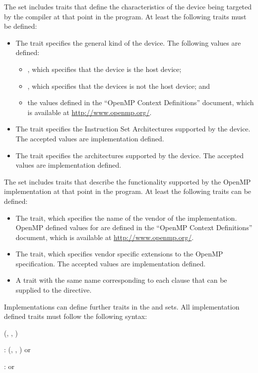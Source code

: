 The  set includes traits that define the characteristics of the device being targeted by the compiler at that point in the program. At least the following traits must be defined:
\begin{itemize}
 \item The  trait specifies the general kind of the device. The following  values are defined:
 \begin{itemize}
  \item {}, which specifies that the device is the host device;
  \item {}, which specifies that the devices is not the host device; and
  \item the values defined in the ``OpenMP Context Definitions'' document,
      which is available at \url{http://www.openmp.org/}.
 \end{itemize}

 \item The  trait specifies the Instruction Set Architectures supported by the device. The accepted  values are implementation defined.
 \item The  trait specifies the architectures supported by the device. The accepted  values are implementation defined.
\end{itemize}

The  set includes traits that describe the functionality supported by the OpenMP implementation at that point in the program. At least the following traits can be defined:
\begin{itemize}
 \item The  trait, which specifies the name of the
     vendor of the implementation. OpenMP defined values for 
     are defined in the ``OpenMP Context Definitions'' document, which is
     available at \url{http://www.openmp.org/}.
 \item The  trait, which specifies vendor
     specific extensions to the OpenMP specification. The accepted
      values are implementation defined.
 \item A trait with the same name corresponding to each clause that can be
     supplied to the  directive.
\end{itemize}


Implementations can define further traits in the  and  sets. All implementation defined traits must follow the following syntax:
\begin{ompSyntax}
\plc{identifier[}(\plc{context-element[}, \plc{context-element[}, \plc{...]]})\plc{]}

:
  \plc{identifier[}(\plc{context-element[}, \plc{context-element[}, \plc{...]]})\plc{]}
  or

:
  or
\end{ompSyntax}

